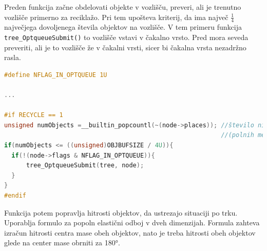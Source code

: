 \documentclass[a4paper,12pt]{article}
\begin{document}
Preden funkcija začne obdelovati objekte v vozlišču, preveri, ali je trenutno vozlišče primerno za reciklažo.
Pri tem upošteva kriterij, da ima največ {\small$ \frac{1}{4}$} največjega dovoljenega števila objektov na vozlišče.
V tem primeru funkcija \lstinline{tree_OptqueueSubmit()} to vozlišče vstavi v čakalno vrsto.
Pred mora seveda preveriti, ali je to vozlišče že v čakalni vrsti, sicer bi čakalna vrsta nezadržno rasla.
\newpage
\begin{lstlisting}[caption={\lstinline|vector_update()| -- Reciklaža}, label=vectorupdate2, language=C]
#define NFLAG_IN_OPTQUEUE 1U

...

#if RECYCLE == 1
unsigned numObjects =__builtin_popcountl(~(node->places)); //število ničel
                                                           //(polnih mest)
if(numObjects <= ((unsigned)OBJBUFSIZE / 4U)){
  if(!(node->flags & NFLAG_IN_OPTQUEUE)){
      tree_OptqueueSubmit(tree, node);
  }
}
#endif
\end{lstlisting}
Funkcija potem popravlja hitrosti objektov, da ustrezajo situaciji po trku. Uporablja formulo za popoln elastični odboj
v dveh dimenzijah. Formula zahteva izračun hitrosti centra mase obeh objektov, nato je treba hitrosti obeh objektov
glede na center mase obrniti za 180°.
\end{document}
